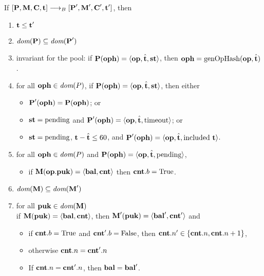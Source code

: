\documentclass[a4paper]{llncs}
\begin{document}
\begin{proposition}
If $[\textbf{P}, \textbf{M}, \textbf{C}, \textbf{t}] \stackrel{{}}\longrightarrow_B{}
[\textbf{P}', \textbf{M}', \textbf{C}', \textbf{t}']$, then
\begin{enumerate}
\item $\textbf{t} \le \textbf{t}'$
\item\label{item:1} $\textit{dom} (\textbf{P}) \subseteq \textit{dom}(\textbf{P}')$
\item invariant for the pool: if  $\textbf{P} (\textbf{oph}) = \langle\textbf{op},
    \hat{\textbf{t}}, \textbf{st}\rangle$, then $\textbf{oph} = \textup{genOpHash} (\textbf{op},
  \hat{\textbf{t}})$. 
\item for all $\textbf{oph} \in \textit{dom}(P)$, if 
  $\textbf{P} (\textbf{oph}) = \langle\textbf{op},  \hat{\textbf{t}}, \textbf{st}\rangle$, then either
  \begin{itemize}
  \item     $\textbf{P}'    (\textbf{oph}) = \textbf{P} (\textbf{oph})$; or
  \item $\textbf{st}  = \text{pending}$ and $\textbf{P}' (\textbf{oph}) =
    \langle\textbf{op}, \hat{\textbf{t}}, \text{timeout}\rangle$; or
  \item  $\textbf{st}  = \text{pending}$, $\textbf{t} - \hat{\textbf{t}}
    \le 60 $, and
    $\textbf{P}' (\textbf{oph}) =       \langle\textbf{op}, \hat{\textbf{t}}, \text{included}\
      \textbf{t}\rangle$.
  \end{itemize}
 \item\label{item:2} for all $\textbf{oph} \in \textit{dom}(P)$ and $\textbf{P} (\textbf{oph}) = \langle\textbf{op},  \hat{\textbf{t}}, \text{pending}\rangle$, 
    \begin{itemize}
    	\item  if $\textbf{M}(\textbf{op}.\textbf{puk}) =  \langle\textbf{bal}, \textbf{cnt}\rangle$ then  
  $\textbf{cnt}.b = \text{True}$.
    \end{itemize}
 \item\label{item:3} $ \textit{dom} (\textbf{M}) \subseteq \textit{dom} (\textbf{M}')$
 \item\label{item:4} for all $\textbf{puk} \in \textit{dom} (\textbf{M})$\\
   if $\textbf{M} (\textbf{puk}) =
   \langle\textbf{bal}, \textbf{cnt}\rangle$, 
   then $\textbf{M}' (\textbf{puk}) =
   \langle\textbf{bal}', \textbf{cnt}'\rangle$ and
   \begin{itemize}
   \item if $\textbf{cnt}.b=\text{True}$ and $\textbf{cnt}'.b=\text{False}$, then $\textbf{cnt}.n' \in \{
     \textbf{cnt}.n,  \textbf{cnt}.n+1\}$,
   \item otherwise $\textbf{cnt}.n = \textbf{cnt}'.n$
   \item If $\textbf{cnt}.n = \textbf{cnt}'.n$, then $\textbf{bal} = \textbf{bal}'$.
   \end{itemize}


\end{enumerate}
\end{proposition}
\end{document}
